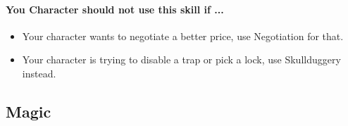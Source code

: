 \begin{multicols}{2}
\paragraph{You Character should not use this skill if ...}
\begin{itemize}
    \item Your character wants to negotiate a better price, use Negotiation for that.
    \item Your character is trying to disable a trap or pick a lock, use Skullduggery instead.
\end{itemize}

\end{multicols}
\subsection{Magic}
